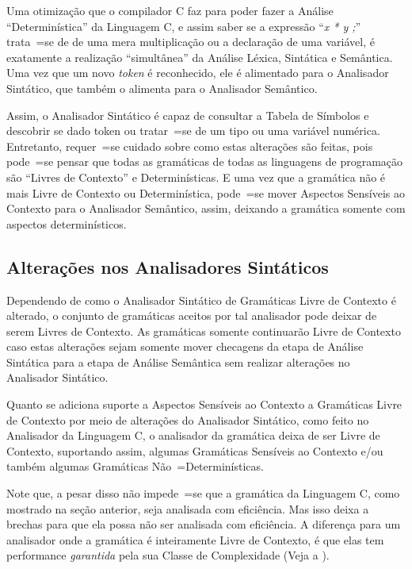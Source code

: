 {    Uma otimização que o compilador C faz para poder fazer a Análise ``Determinística'' da Linguagem C,
    e assim saber se a expressão ``\textit{x * y ;}'' trata~=se de de uma mera multiplicação ou
    a declaração de uma variável,
    é exatamente a realização ``simultânea'' da Análise Léxica,
    Sintática e
    Semântica.
    Uma vez que um novo \textit{token} é reconhecido,
    ele é alimentado para o Analisador Sintático,
    que também o alimenta para o Analisador Semântico.

    Assim,
    o Analisador Sintático é capaz de consultar a Tabela de Símbolos \cite{ahoCompilerDragonBook} e
    descobrir se dado token ou
    tratar~=se de um tipo ou
    uma variável numérica.
    Entretanto,
    requer~=se cuidado sobre como estas alterações são feitas,
    pois pode~=se pensar que todas as gramáticas de todas as linguagens de programação são ``Livres de Contexto'' e
    Determinísticas.
    E uma vez que a gramática não é mais Livre de Contexto ou
    Determinística,
    pode~=se mover Aspectos Sensíveis ao Contexto para o Analisador Semântico,
    assim,
    deixando a gramática somente com aspectos determinísticos.


\subsection{Alterações nos Analisadores Sintáticos}

    Dependendo de como o Analisador Sintático de Gramáticas Livre de Contexto é alterado,
    o conjunto de gramáticas aceitos por tal analisador pode deixar de serem Livres de Contexto.
    As gramáticas somente continuarão Livre de Contexto caso estas alterações sejam somente mover checagens da etapa de Análise Sintática para a etapa de Análise Semântica sem realizar alterações no Analisador Sintático.

    Quanto se adiciona suporte a Aspectos Sensíveis ao Contexto \cite{contextSensitiveParsing} a Gramáticas Livre de Contexto por meio de alterações do Analisador Sintático,
    como feito no Analisador da Linguagem C,
    o analisador da gramática deixa de ser Livre de Contexto,
    suportando assim,
    algumas Gramáticas Sensíveis ao Contexto e\slash{}ou também algumas Gramáticas Não~=Determinísticas.

    Note que,
    a pesar disso não impede~=se que a gramática da Linguagem C,
    como mostrado na seção anterior,
    seja analisada com eficiência.
    Mas isso deixa a brechas para que ela possa não ser analisada com eficiência.
    A diferença para um analisador onde a gramática é inteiramente Livre de Contexto,
    é que elas tem performance \textit{garantida} pela sua Classe de Complexidade (Veja a ).

}
